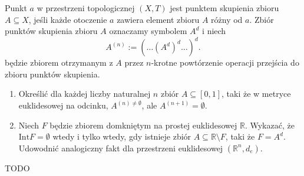 \begin{problem}[1.24]
	Punkt  $a$ w przestrzeni topologicznej $\left( X,T \right) $ jest punktem skupienia zbioru $A \subseteq X$, jeśli każde otoczenie $a$ zawiera element zbioru $A$ różny od $a$. Zbiór punktów skupienia zbioru $A$ oznaczamy symbolem $A^{d}$ i niech 
	\[
	A^{\left( n \right) } := \left( \ldots \left( A^{d} \right) ^{d}\ldots \right)^{d}
	.\] 
będzie zbiorem otrzymanym z $A$ przez $n$-krotne powtórzenie operacji przejścia do zbioru punktów skupienia.
\begin{enumerate}[label=\alph*)]
	\item Określić dla każdej liczby naturalnej $n$ zbiór $A \subseteq \left[ 0,1 \right] $, taki że w metryce euklidesowej na odcinku, $A^{\left( n \right) \neq \emptyset}$, ale $A^{\left( n+1 \right) } = \emptyset$.
	\item Niech $F$ będzie zbiorem domkniętym na prostej euklidesowej $\mathbb{R}$. Wykazać, że $\text{Int}F = \emptyset$ wtedy i tylko wtedy, gdy istnieje zbiór $A \subseteq \mathbb{R}\setminus F$, taki że $F = A^{d}$. Udowodnić analogiczny fakt dla przestrzeni euklidesowej $\left( \mathbb{R}^{n}, d_{e} \right) $.
\end{enumerate}
\end{problem} 
\begin{solution}
	TODO
\end{solution} 
